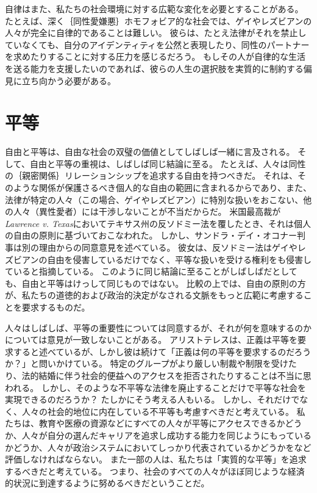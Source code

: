 \documentclass[paper=a4,book,openany]{jlreq}
\begin{document}
自律はまた、私たちの社会環境に対する広範な変化を必要とすることがある。
たとえば、深く｛同性愛嫌悪｝{ホモフォビア}的な社会では、ゲイやレズビアンの人々が完全に自律的であることは難しい。
彼らは、たとえ法律がそれを禁止していなくても、自分のアイデンティティを公然と表現したり、同性のパートナーを求めたりすることに対する圧力を感じるだろう。
もしその人が自律的な生活を送る能力を支援したいのであれば、彼らの人生の選択肢を実質的に制約する偏見に立ち向かう必要がある。

\section{平等}

自由と平等は、自由な社会の双璧の価値としてしばしば一緒に言及される。
そして、自由と平等の重視は、しばしば同じ結論に至る。
たとえば、人々は同性の｛親密関係｝{リレーションシップ}を追求する自由を持つべきだ。
それは、そのような関係が保護さるべき個人的な自由の範囲に含まれるからであり、また、法律が特定の人々（この場合、ゲイやレズビアン）に特別な扱いをおこない、他の人々（異性愛者）には干渉しないことが不当だからだ。
米国最高裁が\emph{Lawrence v. Texas}においてテキサス州の反ソドミー法を覆したとき、それは個人の自由の原則に基づいておこなわれた。
しかし、サンドラ・デイ・オコナー判事は別の理由からの同意意見を述べている。
彼女は、反ソドミー法はゲイやレズビアンの自由を侵害しているだけでなく、平等な扱いを受ける権利をも侵害していると指摘している。
このように同じ結論に至ることがしばしばだとしても、自由と平等はけっして同じものではない。
比較の上では、自由の原則の方が、私たちの道徳的および政治的決定がなされる文脈をもっと広範に考慮することを要求するものだ。

人々はしばしば、平等の重要性については同意するが、それが何を意味するのかについては意見が一致しないことがある。
アリストテレスは、正義は平等を要求すると述べているが、しかし彼は続けて「正義は何の平等を要求するのだろうか？」と問いかけている。
特定のグループがより厳しい制裁や制限を受けたり、法的結婚に伴う社会的便益へのアクセスを拒否されたりすることは不当に思われる。
しかし、そのような不平等な法律を廃止することだけで平等な社会を実現できるのだろうか？ たしかにそう考える人もいる。
しかし、それだけでなく、人々の社会的地位に内在している不平等も考慮すべきだと考えている。
私たちは、教育や医療の資源などにすべての人々が平等にアクセスできるかどうか、人々が自分の選んだキャリアを追求し成功する能力を同じようにもっているかどうか、人々が政治システムにおいてしっかり代表されているかどうかをなど評価しなければならない。
また一部の人は、私たちは「実質的な平等」を追求するべきだと考えている。
つまり、社会のすべての人々がほぼ同じような経済的状況に到達するように努めるべきだということだ。
\end{document}
